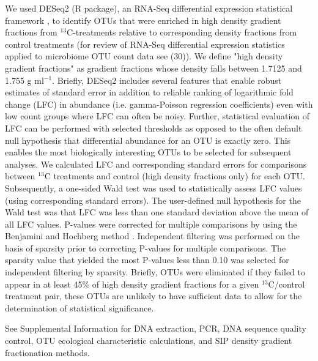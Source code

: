 We used DESeq2 (R package), an RNA-Seq differential expression statistical
framework \citep{love2014}, to identify OTUs that were enriched in high
density gradient fractions from $^{13}$C-treatments relative to corresponding
density fractions from control treatments (for review of RNA-Seq differential
expression statistics applied to microbiome OTU count data see (30)). We define
"high density gradient fractions" as gradient fractions whose density falls
between 1.7125 and 1.755 g ml$^{-1}$. Briefly, DESeq2 includes several features that
enable robust estimates of standard error in addition to reliable ranking of
logarithmic fold change (LFC) in abundance (i.e. gamma-Poisson regression
coefficients) even with low count groups where LFC can often be noisy.
Further, statistical evaluation of LFC can be performed with selected
thresholds as opposed to the often default null hypothesis that differential
abundance for an OTU is exactly zero. This enables the most biologically
interesting OTUs to be selected for subsequent analyses. We calculated LFC
and corresponding standard errors for comparisons between $^{13}$C
treatments and control (high density fractions only) for each OTU.
Subsequently, a one-sided Wald test was used to statistically assess LFC
values (using corresponding standard errors). The user-defined null
hypothesis for the Wald test was that LFC was less than one standard
deviation above the mean of all LFC values. P-values were corrected for
multiple comparisons by using the Benjamini and Hochberg method
\citep{benjamini1995}. Independent filtering was performed on the basis of
sparsity prior to correcting P-values for multiple comparisons. The
sparsity value that yielded the most P-values less than 0.10 was selected
for independent filtering by sparsity. Briefly, OTUs were eliminated if
they failed to appear in at least 45\% of high density gradient fractions
for a given $^{13}$C/control treatment pair, these OTUs are unlikely to
have sufficient data to allow for the determination of statistical
significance.

See Supplemental Information for DNA extraction, PCR, DNA sequence quality
control, OTU ecological characteristic calculations, and SIP density gradient
fractionation methods.
